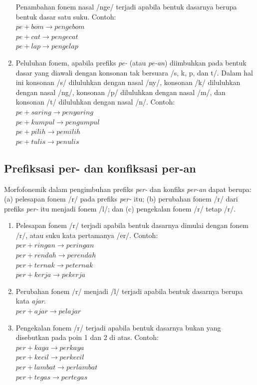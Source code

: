 \begin{enumerate}
	Penambahan fonem nasal /nge/ terjadi apabila bentuk dasarnya berupa bentuk dasar satu suku. Contoh:\\
	$pe + bom \rightarrow pengebom$\\
	$pe + cat \rightarrow pengecat$\\
	$pe + lap \rightarrow pengelap$
	
	\item Peluluhan fonem, apabila prefiks \textit{pe-} (atau \textit{pe-an}) diimbuhkan pada bentuk dasar yang diawali dengan konsonan tak bersuara /s, k, p, dan t/. Dalam hal ini konsonan /s/ diluluhkan dengan nasal /ny/, konsonan /k/ diluluhkan dengan nasal /ng/, konsonan /p/ diluluhkan dengan nasal /m/, dan konsonan /t/ diluluhkan dengan nasal /n/. Contoh:\\
	$pe + saring \rightarrow penyaring$\\
	$pe + kumpul \rightarrow pengumpul$\\
	$pe + pilih \rightarrow pemilih$\\
	$pe + tulis \rightarrow penulis$
	
\end{enumerate}


\subsection{Prefiksasi per- dan konfiksasi per-an}
\label{sec:prefiksasiPer-}

Morfofonemik dalam pengimbuhan prefiks \textit{per-} dan konfiks \textit{per-an} dapat berupa: (a) pelesapan fonem /r/ pada prefiks \textit{per-} itu; (b) perubahan fonem /r/ dari prefiks \textit{per-} itu menjadi fonem /l/; dan (c) pengekalan fonem /r/ tetap /r/.

\begin{enumerate}
	\item Pelesapan fonem /r/ terjadi apabila bentuk dasarnya dimulai dengan fonem /r/, atau suku kata pertamanya /er/. Contoh:\\
	$per + ringan \rightarrow peringan$\\
	$per + rendah \rightarrow perendah$\\
	$per + ternak \rightarrow peternak$\\
	$per + kerja \rightarrow pekerja$
	
	\item Perubahan fonem /r/ menjadi /l/ terjadi apabila bentuk dasarnya berupa kata \textit{ajar}.\\
	$per + ajar \rightarrow pelajar$
	
	\item Pengekalan fonem /r/ terjadi apabila bentuk dasarnya bukan yang disebutkan pada poin 1 dan 2 di atas. Contoh:\\
	$per + kaya \rightarrow perkaya$\\
	$per + kecil \rightarrow perkecil$\\
	$per + lambat \rightarrow perlambat$\\
	$per + tegas \rightarrow pertegas$	
	
\end{enumerate}


